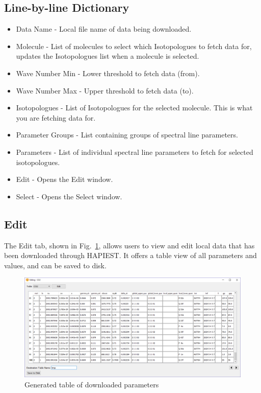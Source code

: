 \documentclass[12pt]{article}
\begin{document}
\newpage
\subsection*{Line-by-line Dictionary}
\begin{itemize}
\item Data Name - Local file name of data being downloaded.
\item Molecule - List of molecules to select which Isotopologues to fetch data for, updates the Isotopologues list when a molecule is selected.
\item Wave Number Min - Lower threshold to fetch data (from).
\item Wave Number Max - Upper threshold to fetch data (to).
\item Isotopologues - List of Isotopologues for the selected molecule. This is what you are fetching data for.
\item Parameter Groups - List containing groups of spectral line parameters.
\item Parameters - List of individual spectral line parameters to fetch for selected isotopologues.
\item Edit - Opens the Edit window.
\item Select - Opens the Select window.
\end{itemize}
\newpage

\subsection{Edit}
The Edit tab, shown in Fig.~\ref{fig:edit}, allows users to view and edit local data that has been downloaded through HAPIEST. It offers a table view of all parameters and values, and can be saved to disk.
\begin{figure}[h]
\centering
\includegraphics[scale = 0.5]{hapiest_edit.png}
\caption{Generated table of downloaded parameters}
\label{fig:edit}
\end{figure}
\end{document}
